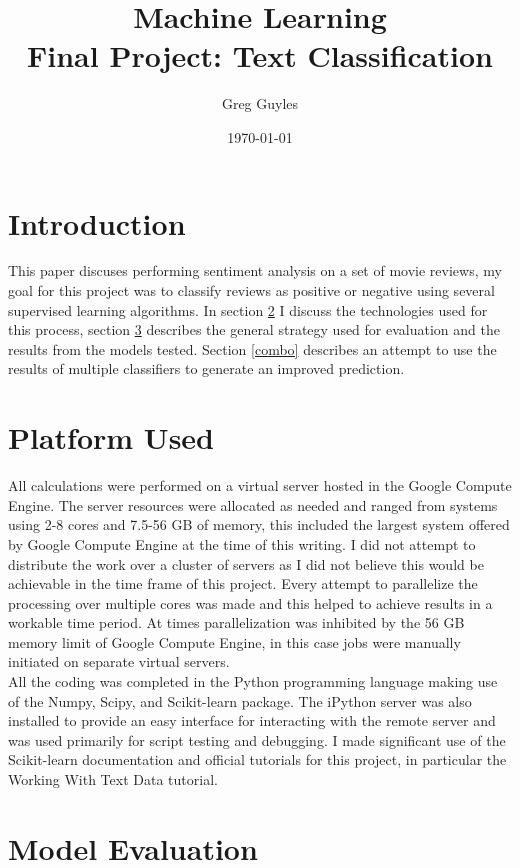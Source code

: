 \documentclass[11pt]{article}
\title{Machine Learning\\Final Project: Text Classification}
\date{\today}
\author{Greg Guyles}
\begin{document}
\maketitle

\section{Introduction}
This paper discuses performing sentiment analysis on a set of movie reviews, my goal for this project was to classify reviews as positive or negative using several supervised learning algorithms. In section \ref{platform} I discuss the technologies used for this process, section \ref{model} describes the general strategy used for evaluation and the results from the models tested. Section \ref{combo} describes an attempt to use the results of multiple classifiers to generate an improved prediction. 

\section{Platform Used} \label{platform}
All calculations were performed on a virtual server hosted in the Google Compute Engine. The server resources were allocated as needed and ranged from systems using 2-8 cores and 7.5-56 GB of memory, this included the largest system offered by Google Compute Engine at the time of this writing. I did not attempt to distribute the work over a cluster of servers as I did not believe this would be achievable in the time frame of this project. Every attempt to parallelize the processing over multiple cores was made and this helped to achieve results in a workable time period. At times parallelization was inhibited by the 56 GB memory limit of Google Compute Engine, in this case jobs were manually initiated on separate virtual servers.\\

All the coding was completed in the Python programming language making use of the Numpy\cite{SciPy}, Scipy\cite{SciPy}, and Scikit-learn\cite{scikit-learn} package. The iPython\cite{iPython} server was also installed to provide an easy interface for interacting with the remote server and was used primarily for script testing and debugging. I made significant use of the Scikit-learn documentation and official tutorials for this project, in particular the Working With Text Data\cite{workingText} tutorial.

\section{Model Evaluation} \label{model}
\end{document}
